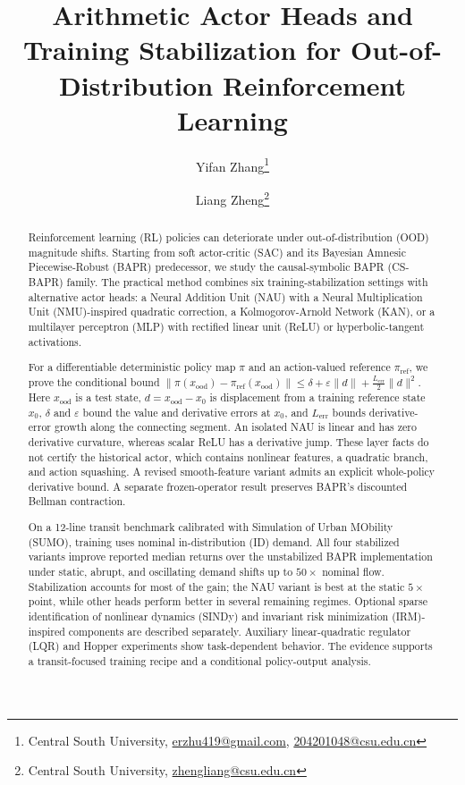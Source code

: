 \documentclass[10pt]{article}
\title{Arithmetic Actor Heads and Training Stabilization for Out-of-Distribution Reinforcement Learning}
\author{
  Yifan Zhang\thanks{Central South University, \href{mailto:erzhu419@gmail.com}{erzhu419@gmail.com}, \href{mailto:204201048@csu.edu.cn}{204201048@csu.edu.cn}} \and
  Liang Zheng\thanks{Central South University, \href{mailto:zhengliang@csu.edu.cn}{zhengliang@csu.edu.cn}}
}
\date{}
\begin{document}
\maketitle


\begin{abstract}
Reinforcement learning (RL) policies can deteriorate under out-of-distribution (OOD) magnitude shifts. Starting from soft actor-critic (SAC) and its Bayesian Amnesic Piecewise-Robust (BAPR) predecessor, we study the causal-symbolic BAPR (CS-BAPR) family. The practical method combines six training-stabilization settings with alternative actor heads: a Neural Addition Unit (NAU) with a Neural Multiplication Unit (NMU)-inspired quadratic correction, a Kolmogorov-Arnold Network (KAN), or a multilayer perceptron (MLP) with rectified linear unit (ReLU) or hyperbolic-tangent activations.

For a differentiable deterministic policy map $\pi$ and an action-valued reference $\pi_{\mathrm{ref}}$, we prove the conditional bound
$\|\pi(x_{\mathrm{ood}})-\pi_{\mathrm{ref}}(x_{\mathrm{ood}})\|
\leq \delta+\varepsilon\|d\|+\tfrac{L_{\mathrm{err}}}{2}\|d\|^2$.
Here $x_{\mathrm{ood}}$ is a test state, $d=x_{\mathrm{ood}}-x_0$ is displacement from a training reference state $x_0$, $\delta$ and $\varepsilon$ bound the value and derivative errors at $x_0$, and $L_{\mathrm{err}}$ bounds derivative-error growth along the connecting segment. An isolated NAU is linear and has zero derivative curvature, whereas scalar ReLU has a derivative jump. These layer facts do not certify the historical actor, which contains nonlinear features, a quadratic branch, and action squashing. A revised smooth-feature variant admits an explicit whole-policy derivative bound. A separate frozen-operator result preserves BAPR's discounted Bellman contraction.

On a 12-line transit benchmark calibrated with Simulation of Urban MObility (SUMO), training uses nominal in-distribution (ID) demand. All four stabilized variants improve reported median returns over the unstabilized BAPR implementation under static, abrupt, and oscillating demand shifts up to $50\times$ nominal flow. Stabilization accounts for most of the gain; the NAU variant is best at the static $5\times$ point, while other heads perform better in several remaining regimes. Optional sparse identification of nonlinear dynamics (SINDy) and invariant risk minimization (IRM)-inspired components are described separately. Auxiliary linear-quadratic regulator (LQR) and Hopper experiments show task-dependent behavior. The evidence supports a transit-focused training recipe and a conditional policy-output analysis.
\end{abstract}
\end{document}
